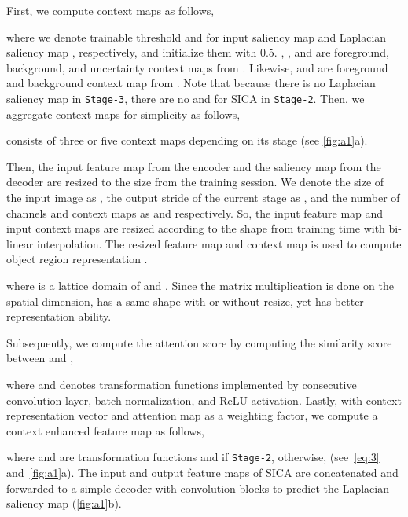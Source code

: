 \documentclass{llncs}
\begin{document}
First, we compute context maps as follows,   


where we denote trainable threshold  and  for input saliency map  and Laplacian saliency map , respectively, and initialize them with 0.5.
, , and  are foreground, background, and uncertainty context maps from . 
Likewise,  and  are foreground and background context map from . 
Note that because there is no Laplacian saliency map in \texttt{Stage-3}, there are no  and  for SICA in \texttt{Stage-2}. 
Then, we aggregate context maps for simplicity as follows,

 consists of three or five context maps depending on its stage (see \cref{fig:a1}a). 

Then, the input feature map from the encoder and the saliency map from the decoder are resized to the size from the training session. 
We denote the size of the input image as , the output stride of the current stage as , and the number of channels and context maps as  and  respectively.
So, the input feature map  and input context maps  are resized according to the shape from training time  with bi-linear interpolation.
The resized feature map  and context map  is used to compute object region representation . 

where  is a lattice domain of  and .
Since the matrix multiplication is done on the spatial dimension,  has a same shape with or without resize, yet has better representation ability.

Subsequently, we compute the attention score  by computing the similarity score between  and ,

where  and  denotes transformation functions implemented by consecutive convolution layer, batch normalization, and ReLU activation. 
Lastly, with context representation vector  and attention map  as a weighting factor, we compute a context enhanced feature map  as follows,

where  and  are transformation functions and  if \texttt{Stage-2}, otherwise,  (see~\cref{eq:3} and~\cref{fig:a1}a). 
The input and output feature maps of SICA are concatenated and forwarded to a simple decoder with convolution blocks to predict the Laplacian saliency map (\cref{fig:a1}b).
\end{document}
